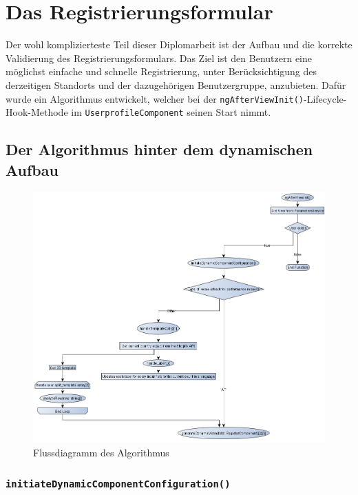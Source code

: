 \chapter{Das Registrierungsformular}

Der wohl komplizierteste Teil dieser Diplomarbeit ist der Aufbau und die korrekte Validierung des Registrierungsformulars. Das Ziel ist den Benutzern eine möglichst einfache und schnelle Registrierung, unter Berücksichtigung des derzeitigen Standorts und der dazugehörigen Benutzergruppe, anzubieten. Dafür wurde ein Algorithmus entwickelt, welcher bei der \texttt{ngAfterViewInit()}-Lifecycle-Hook-Methode im \texttt{UserprofileComponent} seinen Start nimmt.

\section{Der Algorithmus hinter dem dynamischen Aufbau}

\begin{figure}[H]
	\centerline{
		\includegraphics[width=1\textwidth, frame]{./grafiken/RF_Flussdiagramm.png}
	}
	\vskip0pt
	\caption{Flussdiagramm des Algorithmus}
	\label{fig:fc}
\end{figure}

\subsection{\texttt{initiateDynamicComponentConfiguration()}} \label{ssec:lblInitDCC}


